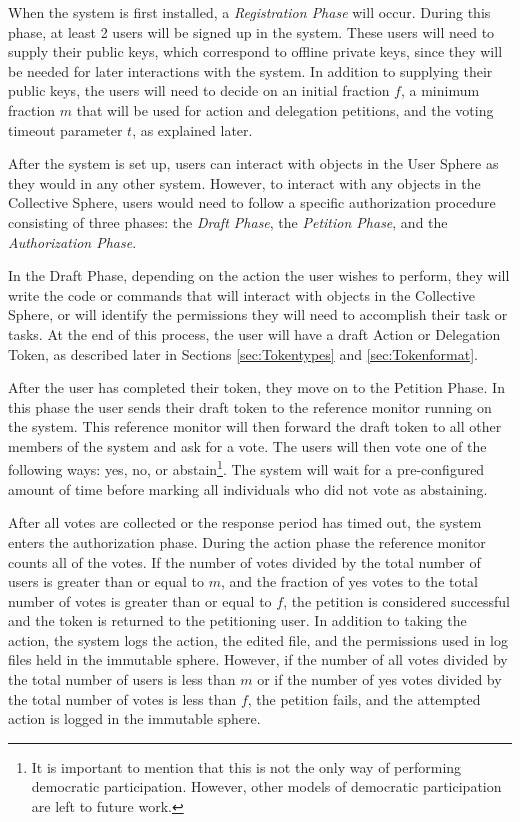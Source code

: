 When the system is first installed, a \textit{Registration Phase} will occur.
During this phase, at least 2 users will be signed up in the system. These users
will need to supply their public keys, which correspond to offline private keys,
since they will be needed for later interactions with the system. In addition to
supplying their public keys, the users will need to decide on an initial
fraction $f$, a minimum fraction $m$ that will be used for action and delegation
petitions, and the voting timeout parameter $t$, as explained later.

After the system is set up, users can interact with objects in the User Sphere
as they would in any other system. However, to interact with any objects in the
Collective Sphere, users would need to follow a specific authorization
procedure consisting of three phases: the \textit{Draft Phase}, the 
\textit{Petition Phase}, and the \textit{Authorization Phase}.

In the Draft Phase, depending on the action the user wishes to perform, they
will write the code or commands that will interact with objects in the
Collective Sphere, or will identify the permissions they will need to accomplish
their task or tasks. At the end of this process, the user will have a draft
Action or Delegation Token, as described later in Sections \ref{sec:Tokentypes}
and \ref{sec:Tokenformat}.

After the user has completed their token, they move on to the Petition Phase. In
this phase the user sends their draft token to the reference monitor running on
the system. This reference monitor will then forward the draft token to all
other members of the system and ask for a vote. The users will then vote one of
the following ways: yes, no, or abstain\footnote{It is important to mention that
this is not the only way of performing democratic participation. However, other
models of democratic participation are left to future work.}. The system will
wait for a pre-configured amount of time before marking all individuals who did not
vote as abstaining.

After all votes are collected or the response period has timed out, the system
enters the authorization phase. During the action phase the reference monitor
counts all of the votes. If the number of votes divided by the total number of
users is greater than or equal to $m$, and the fraction of yes votes to the
total number of votes is greater than or equal to $f$, the petition is
considered successful and the token is returned to the petitioning user. In
addition to taking the action, the system logs the action, the edited file, and
the permissions used in log files held in the immutable sphere. However, if the
number of all votes divided by the total number of users is less than $m$ or if
the number of yes votes divided by the total number of votes is less than $f$,
the petition fails, and the attempted action is logged in the immutable sphere.

